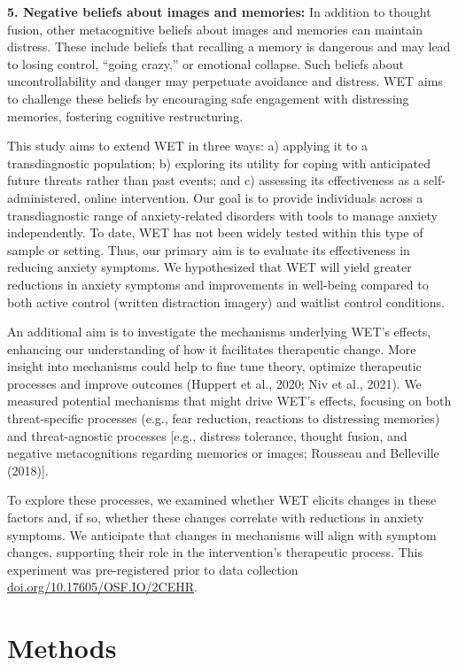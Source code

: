 \documentclass[
  man,floatsintext]{apa7}
\begin{document}
\textbf{5. Negative beliefs about images and memories:}
In addition to thought fusion, other metacognitive beliefs about images and memories can maintain distress.
These include beliefs that recalling a memory is dangerous and may lead to losing control, ``going crazy,'' or emotional collapse.
Such beliefs about uncontrollability and danger may perpetuate avoidance and distress.
WET aims to challenge these beliefs by encouraging safe engagement with distressing memories, fostering cognitive restructuring.

This study aims to extend WET in three ways: a) applying it to a transdiagnostic population; b) exploring its utility for coping with anticipated future threats rather than past events; and c) assessing its effectiveness as a self-administered, online intervention.
Our goal is to provide individuals across a transdiagnostic range of anxiety-related disorders with tools to manage anxiety independently.
To date, WET has not been widely tested within this type of sample or setting.
Thus, our primary aim is to evaluate its effectiveness in reducing anxiety symptoms.
We hypothesized that WET will yield greater reductions in anxiety symptoms and improvements in well-being compared to both active control (written distraction imagery) and waitlist control conditions.

An additional aim is to investigate the mechanisms underlying WET's effects, enhancing our understanding of how it facilitates therapeutic change.
More insight into mechanisms could help to fine tune theory, optimize therapeutic processes and improve outcomes (Huppert et al., 2020; Niv et al., 2021).
We measured potential mechanisms that might drive WET's effects, focusing on both threat-specific processes (e.g., fear reduction, reactions to distressing memories) and threat-agnostic processes {[}e.g., distress tolerance, thought fusion, and negative metacognitions regarding memories or images; Rousseau and Belleville (2018){]}.

To explore these processes, we examined whether WET elicits changes in these factors and, if so, whether these changes correlate with reductions in anxiety symptoms.
We anticipate that changes in mechanisms will align with symptom changes, supporting their role in the intervention's therapeutic process.
This experiment was pre-registered prior to data collection \href{https://doi.org/10.17605/OSF.IO/2CEHR}{doi.org/10.17605/OSF.IO/2CEHR}.

\section{Methods}\label{methods}
\end{document}
